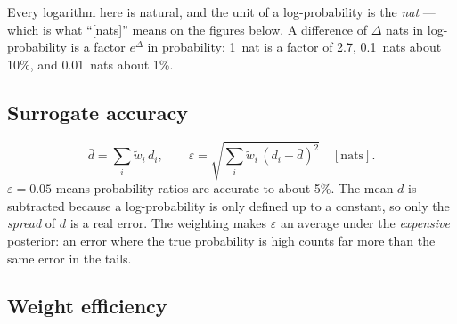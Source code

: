 \begin{keypoint}[Nats]
Every logarithm here is natural, and the unit of a log-probability is the \emph{nat} --- which is
what ``[nats]'' means on the figures below. A difference of $\Delta$ nats in log-probability is a
factor $e^{\Delta}$ in probability: 1~nat is a factor of 2.7, 0.1~nats about 10\%, and 0.01~nats
about 1\%.
\end{keypoint}

\subsection{Surrogate accuracy}

\begin{equation}
  \bar d = \sum_i \tilde w_i\, d_i,
  \qquad
  \varepsilon = \sqrt{\sum_i \tilde w_i\, (d_i - \bar d)^2}\quad[\text{nats}].
  \label{eq:epsilon}
\end{equation}
$\varepsilon = 0.05$ means probability ratios are accurate to about 5\%. The mean $\bar d$ is
subtracted because a log-probability is only defined up to a constant, so only the \emph{spread} of
$d$ is a real error. The weighting makes $\varepsilon$ an average under the \emph{expensive}
posterior: an error where the true probability is high counts far more than the same error in the
tails.

\subsection{Weight efficiency}

